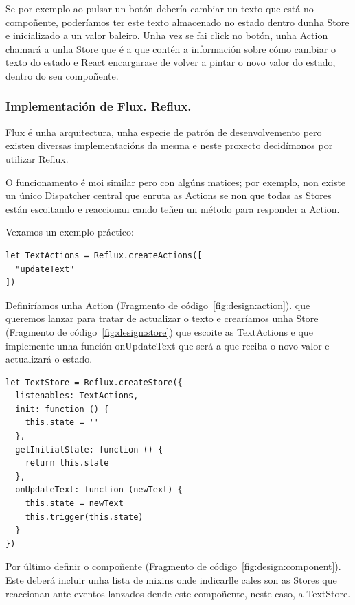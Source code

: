         Se por exemplo ao pulsar un botón debería cambiar un texto que está no 
compoñente, poderíamos ter este texto almacenado no estado dentro dunha Store e 
inicializado a un valor baleiro.
        Unha vez se fai click no botón, unha Action chamará a unha Store que é 
a que contén a información sobre cómo cambiar o texto do estado e React 
encargarase de volver a pintar o novo valor do estado, dentro do seu compoñente.

      \subsubsection{Implementación de Flux. Reflux.}
      Flux é unha arquitectura, unha especie de patrón de desenvolvemento pero 
existen diversas implementacións da mesma e neste proxecto decidímonos por 
utilizar Reflux\cite{web:reflux}.

      O funcionamento é moi similar pero con algúns matices; por exemplo,
non existe un único Dispatcher central que enruta as Actions se non que todas as 
Stores están escoitando e reaccionan cando teñen un método para responder a 
Action.

     Vexamos un exemplo práctico:

    \lstset{}
     \begin{lstlisting}[caption=Exemplo de Action., label=fig:design:action]
let TextActions = Reflux.createActions([
  "updateText"
])
    \end{lstlisting}

    Definiríamos unha Action (Fragmento de código~\ref{fig:design:action}). que 
queremos lanzar para tratar de actualizar o texto e crearíamos unha Store 
(Fragmento de código~\ref{fig:design:store}) que escoite as TextActions e que 
implemente unha función onUpdateText que será a que reciba o novo valor e 
actualizará o estado.

    \lstset{}
     \begin{lstlisting}[caption=Exemplo de Store., label=fig:design:store]
let TextStore = Reflux.createStore({
  listenables: TextActions,
  init: function () {
    this.state = ''
  },
  getInitialState: function () {
    return this.state
  },
  onUpdateText: function (newText) {
    this.state = newText
    this.trigger(this.state)
  }
})
    \end{lstlisting}

    Por último definir o compoñente (Fragmento de 
código~\ref{fig:design:component}). Este deberá incluir unha lista de mixins 
onde indicarlle cales son as Stores que reaccionan ante eventos lanzados 
dende este compoñente, neste caso, a TextStore.

